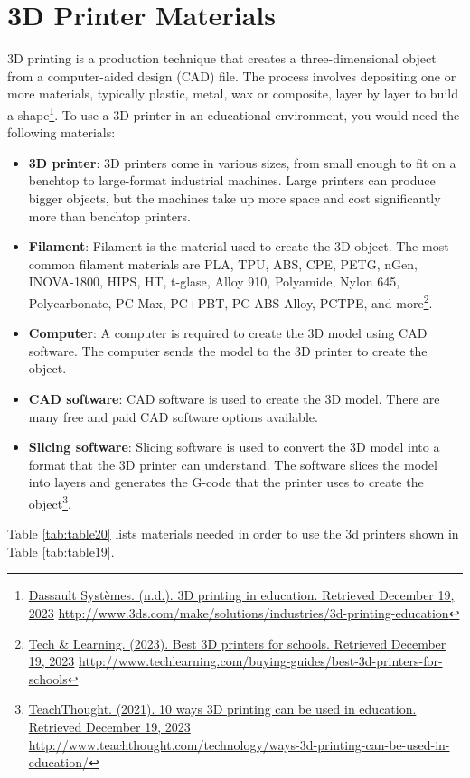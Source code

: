 \pagebreak
\hypertarget{d-printer-materials}{}\section{3D Printer Materials}\label{d-printer-materials}
3D printing is a production technique that creates a three-dimensional object from a computer-aided design (CAD) file. The process involves depositing one or more materials, typically plastic, metal, wax or composite, layer by layer to build a shape\footnote{\raggedright \href{http://www.3ds.com/make/solutions/industries/3d-printing-education}{Dassault Systèmes. (n.d.). 3D printing in education. Retrieved December 19, 2023} \url{http://www.3ds.com/make/solutions/industries/3d-printing-education}}. To use a 3D printer in an educational environment, you would need the following materials:

\begin{itemize}[leftmargin=*]
\item \textbf{3D printer}: 3D printers come in various sizes, from small enough to fit on a benchtop to large-format industrial machines. Large printers can produce bigger objects, but the machines take up more space and cost significantly more than benchtop printers\footnotemark[\value{footnote}].
\item \textbf{Filament}: Filament is the material used to create the 3D object. The most common filament materials are PLA, TPU, ABS, CPE, PETG, nGen, INOVA-1800, HIPS, HT, t-glase, Alloy 910, Polyamide, Nylon 645, Polycarbonate, PC-Max, PC+PBT, PC-ABS Alloy, PCTPE, and more\footnote{\raggedright \href{http://www.techlearning.com/buying-guides/best-3d-printers-for-schools}{Tech \& Learning. (2023). Best 3D printers for schools. Retrieved December 19, 2023} \url{http://www.techlearning.com/buying-guides/best-3d-printers-for-schools}}.
\item \textbf{Computer}: A computer is required to create the 3D model using CAD software. The computer sends the model to the 3D printer to create the object.
\item \textbf{CAD software}: CAD software is used to create the 3D model. There are many free and paid CAD software options available.
\item \textbf{Slicing software}: Slicing software is used to convert the 3D model into a format that the 3D printer can understand. The software slices the model into layers and generates the G-code that the printer uses to create the object\footnote{\raggedright \href{http://www.teachthought.com/technology/ways-3d-printing-can-be-used-in-education/}{TeachThought. (2021). 10 ways 3D printing can be used in education. Retrieved December 19, 2023} \url{http://www.teachthought.com/technology/ways-3d-printing-can-be-used-in-education/}}.
\end{itemize}
Table \ref{tab:table20} lists materials needed in order to use the 3d printers shown in Table \ref{tab:table19}.

